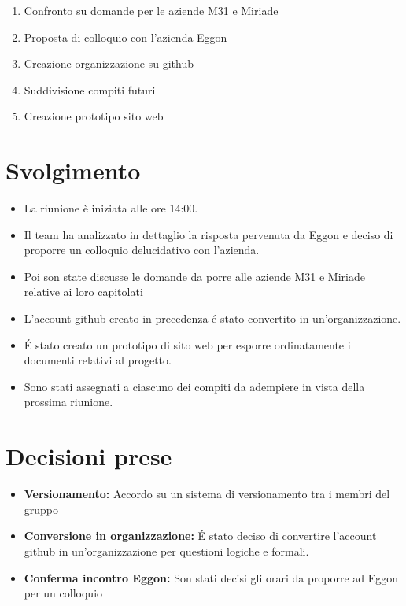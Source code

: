 \documentclass[a4paper,12pt]{article}
\begin{document}
\begin{enumerate}
    \item Confronto su domande per le aziende M31 e Miriade
    \item Proposta di colloquio con l'azienda Eggon
    \item Creazione organizzazione su github
    \item Suddivisione compiti futuri
    \item Creazione prototipo sito web
\end{enumerate}

\section{Svolgimento}

\begin{itemize}
    \item La riunione è iniziata alle ore 14:00.
    \item Il team ha analizzato in dettaglio la risposta pervenuta da Eggon e deciso di proporre un colloquio delucidativo con l'azienda.
    \item Poi son state discusse le domande da porre alle aziende M31 e Miriade relative ai loro capitolati
    \item L'account github creato in precedenza é stato convertito in un'organizzazione.
    \item É stato creato un prototipo di sito web per esporre ordinatamente i documenti relativi al progetto.
    \item Sono stati assegnati a ciascuno dei compiti da adempiere in vista della prossima riunione.
\end{itemize}

\section{Decisioni prese}

\begin{itemize}
    \item \textbf{Versionamento:} Accordo su un sistema di versionamento tra i membri del gruppo
    \item \textbf{Conversione in organizzazione:} É stato deciso di convertire l'account github in un'organizzazione per questioni logiche e formali.
    \item \textbf{Conferma incontro Eggon:} Son stati decisi gli orari da proporre ad Eggon per un colloquio
\end{itemize}
\end{document}
